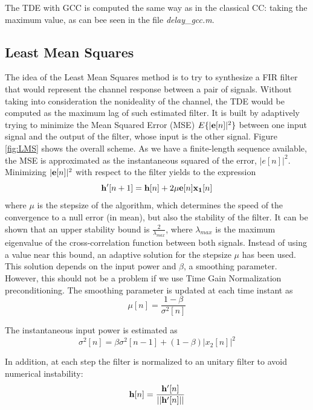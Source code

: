 The TDE with GCC is computed the same way as in the classical CC: taking the maximum value, as can bee seen in the file \emph{delay\_gcc.m}\cite{delaygcc.m}.

\subsection{Least Mean Squares}
The idea of the Least Mean Squares method is to try to synthesize a FIR filter that would represent the channel response between a pair of signals. Without taking into consideration the nonideality of the channel, the TDE would be computed as the maximum lag of such estimated filter. It is built by adaptively trying to minimize the Mean Squared Error (MSE) $E\{|\mathbf{e}[n]|^2\}$ between one input signal and the output of the filter, whose input is the other signal. Figure \ref{fig:LMS} shows the overall scheme. As we have a finite-length sequence available, the MSE is approximated as the instantaneous squared of the error, $|e[n]|^2$. Minimizing $|\mathbf{e}[n]|^2$ with respect to the filter yields to the expression
\begin{dmath}
  \vect{h'}[n+1] = \vect{h}[n] + 2 \mu \vect{e}[n] \vect{x_1}[n]
\end{dmath}
where $\mu$ is the stepsize of the algorithm, which determines the speed of the convergence to a null error (in mean), but also the stability of the filter. It can be shown that an upper stability bound is $\frac{2}{\lambda_{max}}$, where $\lambda_{max}$ is the maximum eigenvalue of the cross-correlation function between both signals. Instead of using a value near this bound, an adaptive solution for the stepsize $\mu$ has been used. This solution depends on the input power and $\beta$, a smoothing parameter. However, this should not be a problem if we use Time Gain Normalization preconditioning. The smoothing parameter is updated at each time instant as
\begin{dmath}
  \mu[n] = \frac{1-\beta}{\sigma^2[n]}
\end{dmath}

The instantaneous input power is estimated as
\begin{dmath}
  \sigma^2[n] = \beta \sigma^2[n-1] + (1-\beta)|x_2[n]|^2
\end{dmath}

In addition, at each step the filter is normalized to an unitary filter to avoid numerical instability:
\begin{dmath}
  \vect{h}[n] = \frac{\vect{h'}[n]}{||\vect{h'}[n]||}
\end{dmath}

